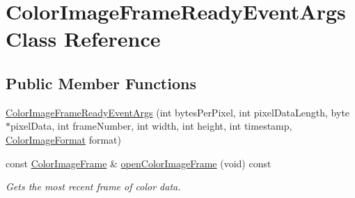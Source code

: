 \hypertarget{class_color_image_frame_ready_event_args}{\section{\-Color\-Image\-Frame\-Ready\-Event\-Args \-Class \-Reference}
\label{class_color_image_frame_ready_event_args}
}
\subsection*{\-Public \-Member \-Functions}
\begin{DoxyCompactItemize}
\item 
\hyperlink{class_color_image_frame_ready_event_args_a419a9889cbdb932533d707fa2b483da6}{\-Color\-Image\-Frame\-Ready\-Event\-Args} (int bytes\-Per\-Pixel, int pixel\-Data\-Length, byte $\ast$pixel\-Data, int frame\-Number, int width, int height, int timestamp, \hyperlink{color_image_format_8h_a77f719572c3c368859dd2ec3153d8452}{\-Color\-Image\-Format} format)
\item 
const \hyperlink{class_color_image_frame}{\-Color\-Image\-Frame} \& \hyperlink{class_color_image_frame_ready_event_args_a39fa2540610bd260f0c8a3029cae011c}{open\-Color\-Image\-Frame} (void) const 
\begin{DoxyCompactList}\small\item\em \-Gets the most recent frame of color data. \end{DoxyCompactList}\end{DoxyCompactItemize}


